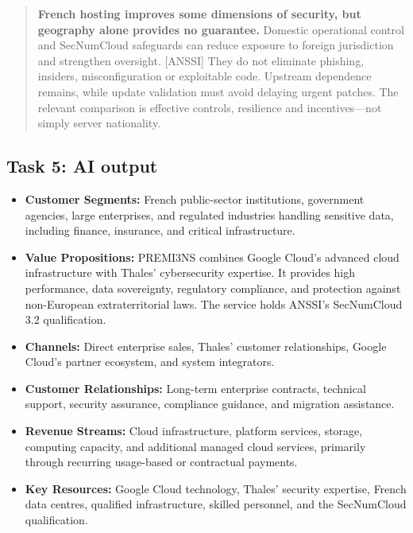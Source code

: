 \begin{quote}
\textbf{French hosting improves some dimensions of security, but geography alone provides no guarantee.} Domestic operational control and SecNumCloud safeguards can reduce exposure to foreign jurisdiction and strengthen oversight. [ANSSI] They do not eliminate phishing, insiders, misconfiguration or exploitable code. Upstream dependence remains, while update validation must avoid delaying urgent patches. The relevant comparison is effective controls, resilience and incentives—not simply server nationality.
\end{quote}


\subsection{Task 5: AI output}

\begin{itemize}
    \item \textbf{Customer Segments:} French public-sector institutions, government agencies, large enterprises, and regulated industries handling sensitive data, including finance, insurance, and critical infrastructure.

    \item \textbf{Value Propositions:} PREMI3NS combines Google Cloud's advanced cloud infrastructure with Thales' cybersecurity expertise. It provides high performance, data sovereignty, regulatory compliance, and protection against non-European extraterritorial laws. The service holds ANSSI's SecNumCloud 3.2 qualification.

    \item \textbf{Channels:} Direct enterprise sales, Thales' customer relationships, Google Cloud's partner ecosystem, and system integrators.

    \item \textbf{Customer Relationships:} Long-term enterprise contracts, technical support, security assurance, compliance guidance, and migration assistance.

    \item \textbf{Revenue Streams:} Cloud infrastructure, platform services, storage, computing capacity, and additional managed cloud services, primarily through recurring usage-based or contractual payments.

    \item \textbf{Key Resources:} Google Cloud technology, Thales' security expertise, French data centres, qualified infrastructure, skilled personnel, and the SecNumCloud qualification.


\end{itemize}
